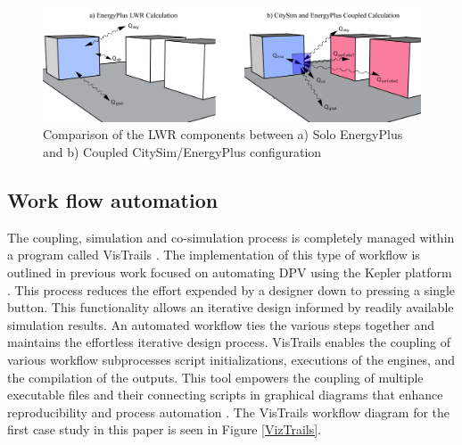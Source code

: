 \documentclass{tBPS2e}
\theoremstyle{plain}
\theoremstyle{definition}
\theoremstyle{remark}
\begin{document}
\begin{figure}[H]
  \centering
  \includegraphics[width=1.0\textwidth]{figures/LWRCalc_Combined_V3}
  \caption{Comparison of the LWR components between a) Solo EnergyPlus and b) Coupled 
  CitySim/EnergyPlus configuration \citep{miller_long_2015}
  \label{combinedLWR}}
\end{figure}

\subsection{Work flow automation}
The coupling, simulation and co-simulation process is completely managed
within a program called VisTrails \citep{freire_reproducibility_2014}. The
implementation of this type of workflow is outlined in previous work focused
on automating DPV using the Kepler platform \citep{thomas_customizable_2012}. This
process reduces the effort expended by a designer down to pressing a single
button. This functionality allows an iterative design informed by
readily available simulation results. An automated workflow ties the
various steps together and maintains the effortless iterative design process.
VisTrails enables the coupling of various workflow subprocesses script
initializations, executions of the engines, and the compilation of the
outputs. This tool empowers the coupling of multiple executable files and their
connecting scripts in graphical diagrams that enhance reproducibility and
process automation \citep{freire_reproducibility_2014}. The VisTrails workflow diagram for
the first case study in this paper is seen in Figure \ref{VizTrails}.
\end{document}
